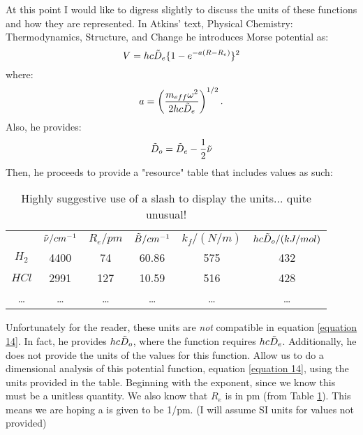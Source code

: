 \documentclass[letterpaper,12pt]{article}
\begin{document}
\begin{tcolorbox}[breakable,title=Units, height fixed for=first and middle]
At this point I would like to digress slightly to discuss the units of these functions and how they are represented.\newline
In Atkins' text, Physical Chemistry: Thermodynamics, Structure, and Change he introduces Morse potential as:
\begin{equation}
    V=hc\Tilde{D}_e\{1-e^{-a(R-R_e)}\}^2
    \label{equation 14}
\end{equation}
where:
\begin{equation}
    a=\left(\frac{m_{eff}\omega^2}{2hc\Tilde{D}_e}\right)^{1/2}.
\end{equation}
Also, he provides:
\begin{equation}
    \Tilde{D}_o=\Tilde{D}_e-\frac{1}{2}\Tilde{\nu}
    \label{equation 16}
\end{equation}
Then, he proceeds to provide a "resource" table that includes values as such:
\begin{table}[H]
\centering
\begin{tabular}{cccccc}
\rowcolor[HTML]{C0C0C0} 
                              & $\Tilde{\nu}/cm^{-1}$ & $R_e/pm$ & $\Tilde{B}/cm^{-1}$ & $k_f/(N/m)$ & $hc\Tilde{D}_o/(kJ/mol)$ \\
\rowcolor[HTML]{EFEFEF} 
\cellcolor[HTML]{C0C0C0}$H_2$ & 4400                & 74    & 60.86             & 575         & 432                      \\
\rowcolor[HTML]{EFEFEF} 
\cellcolor[HTML]{C0C0C0}$HCl$ & 2991                & 127   & 10.59             & 516         & 428                      \\
\rowcolor[HTML]{EFEFEF} 
\cellcolor[HTML]{C0C0C0}…     & …                   & …     & …                 & …           & …                       
\end{tabular}
\caption{Highly suggestive use of a slash to display the units... quite unusual!}
\label{table 1}
\end{table}
Unfortunately for the reader, these units are \textit{not} compatible in equation \ref{equation 14}. In fact, he provides $hc\Tilde{D}_o$, where the function requires $hc\Tilde{D}_e$. Additionally, he does not provide the units of the values for this function.\newline
Allow us to do a dimensional analysis of this potential function, equation \ref{equation 14}, using the units provided in the table. Beginning with the exponent, since we know this must be a unitless quantity. We also know that $R_e$ is in pm (from Table \ref{table 1}). This means we are hoping a is given to be 1/pm. (I will assume SI units for values not provided)

\end{tcolorbox}
\end{document}

